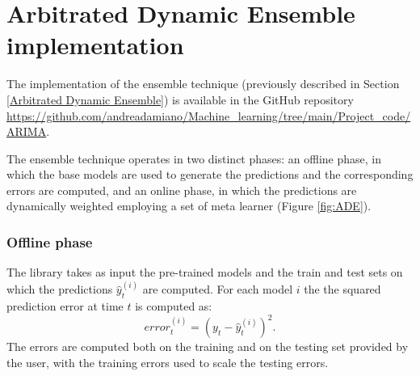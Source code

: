 \section{Arbitrated Dynamic Ensemble implementation}
The implementation of the ensemble technique (previously described in Section \ref{Arbitrated Dynamic Ensemble}) is available in the GitHub repository \url{https://github.com/andreadamiano/Machine_learning/tree/main/Project_code/ARIMA}. 

The ensemble technique operates in two distinct phases: an offline phase, in which the base models are used to generate the predictions and the corresponding errors are computed, and an online phase, in which the predictions are dynamically weighted employing a set of meta learner (Figure \ref{fig:ADE}).

\subsubsection{Offline phase}
The library takes as input the pre-trained models and the train and test sets on which the predictions $\hat{y}_t^{(i)}$ are computed. For each model $i$ the the squared prediction error at time $t$ is computed as: 
\[
error_t^{(i)} = (y_t - \hat{y}_t^{(i)})^2.
\]
The errors are computed both on the training and on the testing set provided by the user, with the training errors used to scale the testing errors. 

